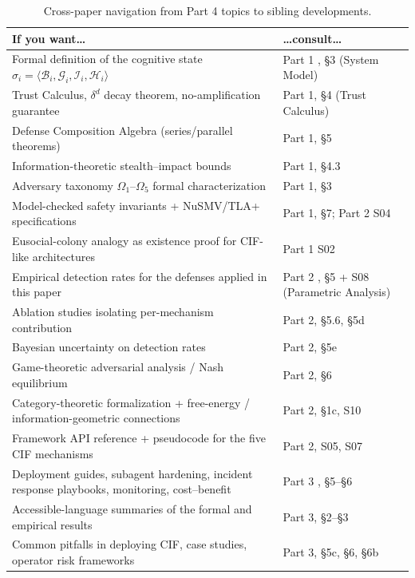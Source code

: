 \documentclass[
]{article}
\begin{document}
\begin{table}[htbp]
\centering
\caption{Cross-paper navigation from Part 4 topics to sibling developments.}
\label{tab:part4-navigation}
\small
\begin{tabular}{@{}p{}p{}@{}}
\toprule
If you want\ldots & \ldots consult\ldots \\
\midrule
Formal definition of the cognitive state $\sigma_i = \langle \mathcal{B}_i, \mathcal{G}_i, \mathcal{I}_i, \mathcal{H}_i \rangle$ & Part 1 \cite{friedman2026cogsec1}, \S{3} (System Model) \\
Trust Calculus, $\delta^d$ decay theorem, no-amplification guarantee & Part 1, \S{4} (Trust Calculus) \\
Defense Composition Algebra (series/parallel theorems) & Part 1, \S{5} \\
Information-theoretic stealth--impact bounds & Part 1, \S{4.3} \\
Adversary taxonomy $\Omega_1$--$\Omega_5$ formal characterization & Part 1, \S{3} \\
Model-checked safety invariants + NuSMV/TLA+ specifications & Part 1, \S{7}; Part 2 S04 \\
Eusocial-colony analogy as existence proof for CIF-like architectures & Part 1 S02 \\
Empirical detection rates for the defenses applied in this paper & Part 2 \cite{friedman2026cogsec2}, \S{5} + S08 (Parametric Analysis) \\
Ablation studies isolating per-mechanism contribution & Part 2, \S{5.6}, \S{5d} \\
Bayesian uncertainty on detection rates & Part 2, \S{5e} \\
Game-theoretic adversarial analysis / Nash equilibrium & Part 2, \S{6} \\
Category-theoretic formalization + free-energy / information-geometric connections & Part 2, \S{1c}, S10 \\
Framework API reference + pseudocode for the five CIF mechanisms & Part 2, S05, S07 \\
Deployment guides, subagent hardening, incident response playbooks, monitoring, cost--benefit & Part 3 \cite{friedman2026cogsec3}, \S{5}--\S{6} \\
Accessible-language summaries of the formal and empirical results & Part 3, \S{2}--\S{3} \\
Common pitfalls in deploying CIF, case studies, operator risk frameworks & Part 3, \S{5c}, \S{6}, \S{6b} \\
\bottomrule
\end{tabular}
\end{table}
\end{document}
